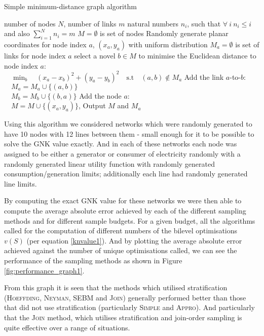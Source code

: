 \begin{algorithm}[]
\caption{Simple minimum-distance graph algorithm}
\label{alg1}
\begin{algorithmic}
    \REQUIRE number of nodes $N$, number of links $m$
    \REQUIRE natural numbers $n_i$, such that $\forall~i~n_i\leq i$ and also $\sum_{i=1}^Nn_i=m$
    \STATE $M=\emptyset$ is set of nodes
        \STATE Randomly generate planar coordinates for node index $a$, $(x_a ,y_a)$ with uniform distribution
        \STATE $M_a=\emptyset$ is set of links for node index $a$
            \STATE select a novel $b\in M$ to minimise the Euclidean distance to node index $a$:\\ $\quad\min_b\quad (x_a-x_b)^2+(y_a-y_b)^2\quad\text{s.t}\quad (a, b)\notin M_a$
            \STATE Add the link $a$-to-$b$:\\ $\quad M_a=M_a\cup \{(a, b)\}$\\ $\quad M_b=M_b\cup \{(b, a)\}$
        \ENDFOR
        \STATE Add the node $a$:\\ $\quad M=M\cup \{(x_a ,y_a)\}$, 
    \ENDFOR
    \STATE Output $M$ and $M_a$ 
\end{algorithmic}
\end{algorithm}

Using this algorithm we considered networks which were randomly generated to have 10 nodes with 12 lines between them - small enough for it to be possible to solve the GNK value exactly.
And in each of these networks each node was assigned to be either a generator or consumer of electricity randomly with a randomly generated linear utility function with randomly generated consumption/generation limits; additionally each line had randomly generated line limits.

By computing the exact GNK value for these networks we were then able to compute the average absolute error achieved by each of the different sampling methods and for different sample budgets.
For a given budget, all the algorithms called for the computation of different numbers of the bilevel optimisations $v(S)$ (per equation \ref{knvalue1}).
And by plotting the average absolute error achieved against the number of unique optimisations called, we can see the performance of the sampling methods as shown in Figure \ref{fig:performance_graph1}.

From this graph it is seen that the methods which utilised stratification (\textsc{Hoeffding}, \textsc{Neyman}, \textsc{SEBM} and \textsc{Join})  generally performed better than those that did not use stratification (particularly \textsc{Simple} and \textsc{Appro}).
And particularly that the \textsc{Join} method, which utilises stratification and join-order sampling is quite effective over a range of situations.

